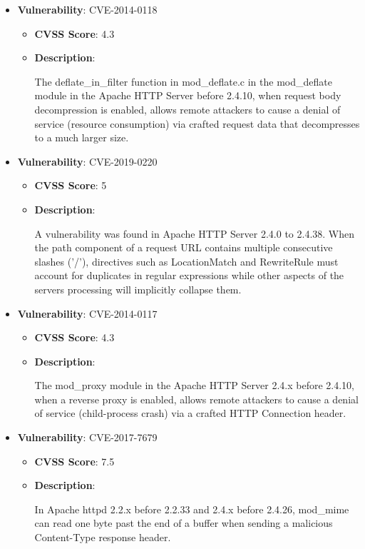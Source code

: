 \documentclass{article}
\begin{document}
\begin{itemize}
    
        \item \textbf{Vulnerability}: CVE-2014-0118
        \begin{itemize}
            \item \textbf{CVSS Score}:  4.3 
            \item \textbf{Description}:
            \parbox[t]{0.9\linewidth}{
                \ttfamily The deflate\_in\_filter function in mod\_deflate.c in the mod\_deflate module in the Apache HTTP Server before 2.4.10, when request body decompression is enabled, allows remote attackers to cause a denial of service (resource consumption) via crafted request data that decompresses to a much larger size.
            }
        \end{itemize}
    
        \item \textbf{Vulnerability}: CVE-2019-0220
        \begin{itemize}
            \item \textbf{CVSS Score}:  5 
            \item \textbf{Description}:
            \parbox[t]{0.9\linewidth}{
                \ttfamily A vulnerability was found in Apache HTTP Server 2.4.0 to 2.4.38. When the path component of a request URL contains multiple consecutive slashes ('/'), directives such as LocationMatch and RewriteRule must account for duplicates in regular expressions while other aspects of the servers processing will implicitly collapse them.
            }
        \end{itemize}
    
        \item \textbf{Vulnerability}: CVE-2014-0117
        \begin{itemize}
            \item \textbf{CVSS Score}:  4.3 
            \item \textbf{Description}:
            \parbox[t]{0.9\linewidth}{
                \ttfamily The mod\_proxy module in the Apache HTTP Server 2.4.x before 2.4.10, when a reverse proxy is enabled, allows remote attackers to cause a denial of service (child-process crash) via a crafted HTTP Connection header.
            }
        \end{itemize}
    
        \item \textbf{Vulnerability}: CVE-2017-7679
        \begin{itemize}
            \item \textbf{CVSS Score}:  7.5 
            \item \textbf{Description}:
            \parbox[t]{0.9\linewidth}{
                \ttfamily In Apache httpd 2.2.x before 2.2.33 and 2.4.x before 2.4.26, mod\_mime can read one byte past the end of a buffer when sending a malicious Content-Type response header.
            }
        \end{itemize}
    

\end{itemize}
\end{document}
